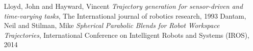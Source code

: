 \documentclass{amsart}
\theoremstyle{plain}
\numberwithin{equation}{section}
\begin{document}
\begin{thebibliography}{9}
Lloyd, John and Hayward, Vincent \textit{Trajectory generation for sensor-driven and time-varying tasks}, The International journal of robotics research, 1993
Dantam, Neil and Stilman, Mike \textit{Spherical Parabolic Blends for Robot Workspace Trajectories}, International Conference on Intelligent Robots and Systems (IROS), 2014

%
%
\end{thebibliography}
\end{document}
